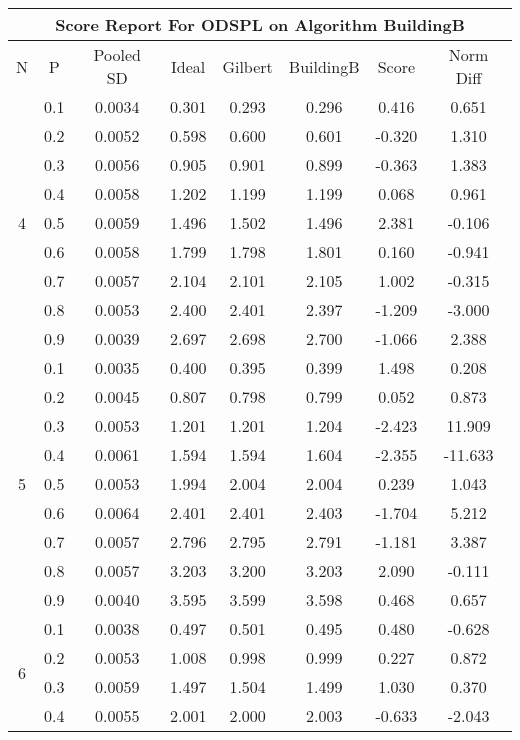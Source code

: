 \documentclass[11pt,a4paper]{report}
\begin{document}
\begin{longtable}{ | c | c || c | c | c | c | c | c | }
\hline
\multicolumn{8}{|c|}{ Score Report For ODSPL on Algorithm BuildingB} \\
\hline
N & P & Pooled SD &  Ideal &  Gilbert & BuildingB  & Score & Norm Diff \\
 \hline
 \hline
 \endhead
\multirow{9}{*}{4} & 0.1 & 0.0034 & 0.301 & 0.293 & 0.296 & 0.416 & 0.651 \\
 & 0.2 & 0.0052 & 0.598 & 0.600 & 0.601 & -0.320 & 1.310 \\
 & 0.3 & 0.0056 & 0.905 & 0.901 & 0.899 & -0.363 & 1.383 \\
 & 0.4 & 0.0058 & 1.202 & 1.199 & 1.199 & 0.068 & 0.961 \\
 & 0.5 & 0.0059 & 1.496 & 1.502 & 1.496 & 2.381 & -0.106 \\
 & 0.6 & 0.0058 & 1.799 & 1.798 & 1.801 & 0.160 & -0.941 \\
 & 0.7 & 0.0057 & 2.104 & 2.101 & 2.105 & 1.002 & -0.315 \\
 & 0.8 & 0.0053 & 2.400 & 2.401 & 2.397 & -1.209 & -3.000 \\
 & 0.9 & 0.0039 & 2.697 & 2.698 & 2.700 & -1.066 & 2.388 \\
 \hline
\multirow{9}{*}{5} & 0.1 & 0.0035 & 0.400 & 0.395 & 0.399 & 1.498 & 0.208 \\
 & 0.2 & 0.0045 & 0.807 & 0.798 & 0.799 & 0.052 & 0.873 \\
 & 0.3 & 0.0053 & 1.201 & 1.201 & 1.204 & -2.423 & 11.909 \\
 & 0.4 & 0.0061 & 1.594 & 1.594 & 1.604 & -2.355 & -11.633 \\
 & 0.5 & 0.0053 & 1.994 & 2.004 & 2.004 & 0.239 & 1.043 \\
 & 0.6 & 0.0064 & 2.401 & 2.401 & 2.403 & -1.704 & 5.212 \\
 & 0.7 & 0.0057 & 2.796 & 2.795 & 2.791 & -1.181 & 3.387 \\
 & 0.8 & 0.0057 & 3.203 & 3.200 & 3.203 & 2.090 & -0.111 \\
 & 0.9 & 0.0040 & 3.595 & 3.599 & 3.598 & 0.468 & 0.657 \\
 \hline
\multirow{9}{*}{6} & 0.1 & 0.0038 & 0.497 & 0.501 & 0.495 & 0.480 & -0.628 \\
 & 0.2 & 0.0053 & 1.008 & 0.998 & 0.999 & 0.227 & 0.872 \\
 & 0.3 & 0.0059 & 1.497 & 1.504 & 1.499 & 1.030 & 0.370 \\
 & 0.4 & 0.0055 & 2.001 & 2.000 & 2.003 & -0.633 & -2.043 \\

\end{longtable}
\end{document}
